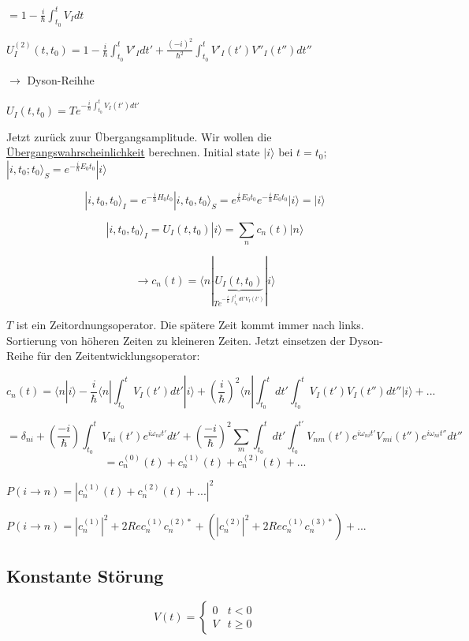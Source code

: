 \( = 1 - \frac{i}{\hbar} \int_{t_0}^{t}V_Idt\)


\(U_I^{(2)}(t,t_0)=1 - \frac{i}{\hbar} \int_{t_0}^{t}V'_Idt' + \frac{(-i)^2}{\hbar^2}\int_{t_0}^{t}V'_I(t')V''_I(t'')dt''\)

\(\rightarrow\) Dyson-Reihhe
  
\(U_I(t,t_0)=T e^{-\frac{i}{\hbar}\int_{t_0}^{t}V_I(t')dt'}\)

Jetzt zurück zuur Übergangsamplitude. Wir wollen die \underline{Übergangswahrscheinlichkeit} berechnen. Initial state \(|i\rangle\) bei \(t=t_0\); \(|i,t_0;t_0\rangle_S = e^{-\frac{i}{\hbar}E_0 t_0}|i\rangle\)

\[ |i,t_0,t_0\rangle_I = e^{-\frac{i}{\hbar}H_0 t_0}|i,t_0,t_0\rangle_S = e^{\frac{i}{\hbar}E_0 t_0}e^{-\frac{i}{\hbar}E_0 t_0}|i\rangle = |i\rangle\]


\[ |i,t_0,t_0\rangle_I = U_I(t,t_0)|i\rangle = \sum_n c_n(t) |n\rangle\]

\[\rightarrow c_n(t) = \langle n|\underbrace{U_I(t,t_0)}_{Te^{-\frac{i}{\hbar}\int_{t_0}^tdt'V_I(t')}}|i\rangle\]

\(T\) ist ein Zeitordnungsoperator. Die spätere Zeit kommt immer nach links. Sortierung von höheren Zeiten zu kleineren Zeiten. Jetzt einsetzen der Dyson-Reihe für den Zeitentwicklungsoperator:

\[ c_n(t) = \langle n|i\rangle - \frac{i}{\hbar}\langle n |\int_{t_0}^t V_I(t')dt'|i\rangle + (\frac{i}{\hbar})^2\langle n |\int_{t_0}^t dt'\int_{t_0}^t V_I(t')V_I(t'')dt'' |i\rangle +...\]

\[ = \delta_{ni}+(\frac{-i}{\hbar})\int_{t_0}^t V_{ni}(t')e^{i\omega_{ni}t'}dt' + (\frac{-i}{\hbar})^2\sum_m\int_{t_0}^tdt'\int_{t_0}^{t'} V_{nm}(t')e^{i\omega_{ni}t'} V_{mi}(t'')e^{i\omega_{ni}t''} dt''\]
\[ = c_n^{(0)}(t)+c_n^{(1)}(t)+c_n^{(2)}(t)+...\]

\(P(i\rightarrow n) = | c_n^{(1)}(t)+c_n^{(2)}(t)+...|^2\)

\(P(i\rightarrow n) = |c_n^{(1)}|^2 + 2Re c_n^{(1)} c_n^{(2)*}+(|c_n^{(2)}|^2 + 2Re c_n^{(1)} c_n^{(3)*})+...\)



\subsection{Konstante Störung}

\[V(t) = \begin{cases}
  0  & t<0\\
  V& t\geq 0
\end{cases}\]

